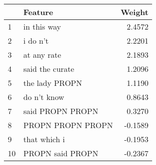\begin{tabular}{llr}
\toprule
{} &            Feature &  Weight \\
\midrule
1  &        in this way &  2.4572 \\
2  &           i do n't &  2.2201 \\
3  &        at any rate &  2.1893 \\
4  &    said the curate &  1.2096 \\
5  &     the lady PROPN &  1.1190 \\
6  &        do n't know &  0.8643 \\
7  &   said PROPN PROPN &  0.3270 \\
8  &  PROPN PROPN PROPN & -0.1589 \\
9  &       that which i & -0.1953 \\
10 &   PROPN said PROPN & -0.2367 \\
\bottomrule
\end{tabular}
